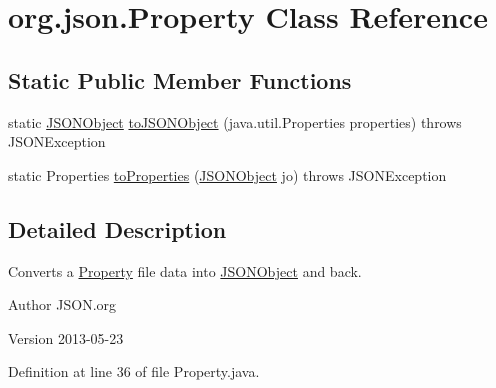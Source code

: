\hypertarget{classorg_1_1json_1_1_property}{\section{org.\-json.\-Property Class Reference}
\label{classorg_1_1json_1_1_property}
}
\subsection*{Static Public Member Functions}
\begin{DoxyCompactItemize}
\item 
static \hyperlink{classorg_1_1json_1_1_j_s_o_n_object}{J\-S\-O\-N\-Object} \hyperlink{classorg_1_1json_1_1_property_aaf04335208523a4f7b41eb9edf3939fb}{to\-J\-S\-O\-N\-Object} (java.\-util.\-Properties properties)  throws J\-S\-O\-N\-Exception 
\item 
static Properties \hyperlink{classorg_1_1json_1_1_property_adbaf75a2454e0563ba90f9adc2822850}{to\-Properties} (\hyperlink{classorg_1_1json_1_1_j_s_o_n_object}{J\-S\-O\-N\-Object} jo)  throws J\-S\-O\-N\-Exception 
\end{DoxyCompactItemize}


\subsection{Detailed Description}
Converts a \hyperlink{classorg_1_1json_1_1_property}{Property} file data into \hyperlink{classorg_1_1json_1_1_j_s_o_n_object}{J\-S\-O\-N\-Object} and back. \begin{DoxyAuthor}{Author}
J\-S\-O\-N.\-org 
\end{DoxyAuthor}
\begin{DoxyVersion}{Version}
2013-\/05-\/23 
\end{DoxyVersion}


Definition at line 36 of file Property.\-java.



